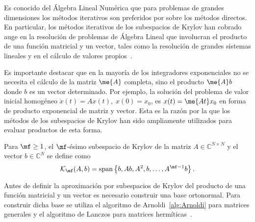 Es conocido del \'Algebra Lineal Num\'erica que para problemas de
grandes dimensiones los m\'etodos iterativos son preferidos por sobre los m\'etodos directos.
En particular,
los m\'etodos iterativos de los subespacios de Krylov han cobrado auge en la resoluci\'on de
problemas de \'Algebra Lineal que involucran el producto de una funci\'on matricial y un vector,
tales como la resoluci\'on de grandes sistemas lineales y en el c\'alculo de valores
propios~\cite{Golub96}.

Es importante destacar que en la mayor\'ia de los integradores exponenciales
 no se necesita el c\'alculo de la matriz $\me{A}$ completa, sino
el producto $\me{A}b$ donde $b$ es un vector determinado. Por ejemplo, la soluci\'on del problema de valor inicial homog\'eneo $\dot{x}(t)=Ax(t),\;x(0)=x_0$, es $x(t)=\me{At}x_0$ en forma de producto exponencial de matriz y vector. Esta es la raz\'on por la que
los m\'etodos de los subespacios de Krylov han sido ampliamente utilizados para evaluar productos de esta forma.

\begin{definition}
        \cite{hoch97} Para $\mf\geq 1$, el $\mf$-\'esimo subespacio de Krylov de la matriz $A\in\mathbb{C}^{N\times N}$
    y el vector $b\in\mathbb{C}^{N}$ se define como
    \[ \mathcal{K}_\mf(A,b)=\mathrm{span}\left\{ b,Ab,A^{2},b,\ldots,A^{\mf-1}b \right\}. \]
\end{definition}



Antes de definir la aproximaci\'on por subespacios de Krylov del producto de una funci\'on matricial y un vector es 
necesario construir una base ortonormal. Para construir dicha base se utiliza el algoritmo de
Arnoldi~\ref{alg:Arnoldi} para matrices generales y el algoritmo de 
Lanczos para matrices hermíticas~\cite{arnoldi,saad2003iterative}.

